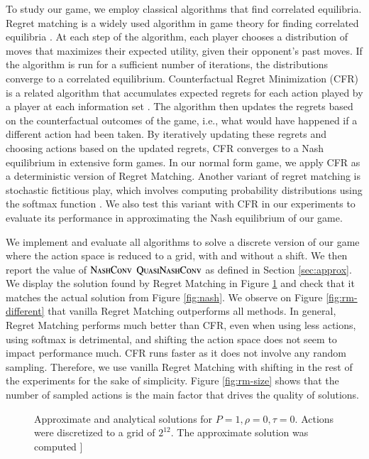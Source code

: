 \documentclass[preprint,12pt,authoryear]{elsarticle}
\theoremstyle{definition}
\begin{document}
To study our game, we employ classical algorithms that find correlated equilibria. Regret matching is a widely used algorithm in game theory for finding correlated equilibria \citep{Hart1997-nk}. At each step of the algorithm, each player chooses a distribution of moves that maximizes their expected utility, given their opponent's past moves. If the algorithm is run for a sufficient number of iterations, the distributions converge to a correlated equilibrium. Counterfactual Regret Minimization (CFR) is a related algorithm that accumulates expected regrets for each action played by a player at each information set \citep{neller2013introduction}. The algorithm then updates the regrets based on the counterfactual outcomes of the game, i.e., what would have happened if a different action had been taken. By iteratively updating these regrets and choosing actions based on the updated regrets, CFR converges to a Nash equilibrium in extensive form games. In our normal form game, we apply CFR as a deterministic version of Regret Matching. Another variant of regret matching is stochastic fictitious play, which involves computing probability distributions using the softmax function \citep{fudenberg1993learning}. We also test this variant with CFR in our experiments to evaluate its performance in approximating the Nash equilibrium of our game.

We implement and evaluate all algorithms to solve a discrete version of our game where the action space is reduced to a grid, with and without a shift. We then report the value of $\textsc{NashConv}$ $\textsc{QuasiNashConv}$ as defined in Section \ref{sec:approx}. We display the solution found by Regret Matching in Figure \ref{fig:rm-sol} and check that it matches the actual solution from Figure \ref{fig:nash}. We observe on Figure \ref{fig:rm-different} that vanilla Regret Matching outperforms all methods. In general, Regret Matching performs much better than CFR, even when using less actions, using softmax is detrimental, and shifting the action space does not seem to impact performance much. CFR runs faster as it does not involve any random sampling. Therefore, we use vanilla Regret Matching with shifting in the rest of the experiments for the sake of simplicity. Figure \ref{fig:rm-size} shows that the number of sampled actions is the main factor that drives the quality of solutions.

\begin{figure}[htbp]
  \centering
  
  \caption{Approximate and analytical solutions for $P=1, \rho=0, \tau=0$. Actions were discretized to a grid of $2^{12}$. The approximate solution was computed ]}
  \label{fig:rm-sol}  
\end{figure}
\end{document}
